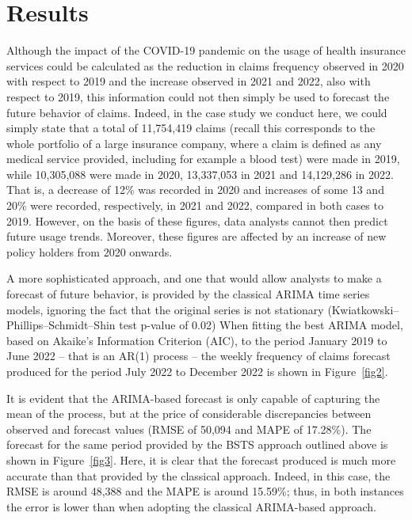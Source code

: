 \documentclass[]{risa}
\begin{document}
\section{Results}\label{results}
Although the impact of the COVID-19 pandemic on the usage of health insurance services could be calculated as the reduction in claims frequency observed in 2020 with respect to 2019 and the increase observed in 2021 and 2022, also with respect to 2019, this information could not then simply be used to forecast the future behavior of claims. Indeed, in the case study we conduct here, we could simply state that a total of 11,754,419 claims (recall this corresponds to the whole portfolio of a large insurance company, where a claim is defined as any medical service provided, including for example a blood test) were made in 2019, while 10,305,088 were made in 2020, 13,337,053 in 2021 and 14,129,286 in 2022. That is, a decrease of 12\% was recorded in 2020 and increases of some 13 and 20\% were recorded, respectively, in 2021 and 2022, compared in both cases to 2019. However, on the basis of these figures, data analysts cannot then predict future usage trends. Moreover, these figures are affected by an increase of new policy holders from 2020 onwards. 


A more sophisticated approach, and one that would allow analysts to make a forecast of future behavior, is provided by the classical ARIMA time series models, ignoring the fact that the original series is not stationary (Kwiatkowski–Phillips–Schmidt–Shin test p-value of 0.02) %
When fitting the best ARIMA model, based on Akaike’s Information Criterion (AIC), to the period January 2019 to June 2022 – that is an AR(1) process – the weekly frequency of claims forecast produced for the period July 2022 to December 2022 is shown in Figure~\ref{fig2}. 

It is evident that the ARIMA-based forecast is only capable of capturing the mean of the process, but at the price of considerable discrepancies between observed and forecast values (RMSE of 50,094 and MAPE of 17.28\%). The forecast for the same period provided by the BSTS approach outlined above is shown in Figure~\ref{fig3}. Here, it is clear that the forecast produced is much more accurate than that provided by the classical approach. Indeed, in this case, the RMSE is around 48,388 and the MAPE is around 15.59\%; thus, in both instances the error is lower than when adopting the classical ARIMA-based approach.
\end{document}
